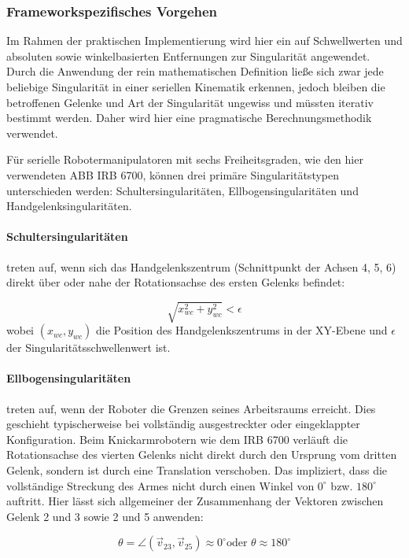 \subsubsection{Frameworkspezifisches Vorgehen}
Im Rahmen der praktischen Implementierung wird hier ein auf Schwellwerten und
absoluten sowie winkelbasierten Entfernungen zur Singularität angewendet. Durch
die Anwendung der rein mathematischen Definition ließe sich zwar jede beliebige
Singularität in einer seriellen Kinematik erkennen, jedoch bleiben die
betroffenen Gelenke und Art der Singularität ungewiss und müssten iterativ
bestimmt werden. Daher wird hier eine pragmatische Berechnungsmethodik
verwendet.

Für serielle Robotermanipulatoren mit sechs Freiheitsgraden, wie den hier
verwendeten ABB IRB 6700, können drei primäre Singularitätstypen unterschieden
werden: Schultersingularitäten, Ellbogensingularitäten und
Handgelenksingularitäten.

\paragraph{Schultersingularitäten} treten auf, wenn sich das
Handgelenkszentrum (Schnittpunkt der Achsen 4, 5, 6) direkt über oder nahe der
Rotationsachse des ersten Gelenks befindet:

\begin{equation}
  \sqrt{x_{wc}^2 + y_{wc}^2} < \epsilon
  \label{eq:shoulder_singularity}
\end{equation}
\noindent
wobei $(x_{wc}, y_{wc})$ die Position des Handgelenkszentrums in der XY-Ebene
und $\epsilon$ der Singularitätsschwellenwert ist.

\paragraph{Ellbogensingularitäten} treten auf, wenn der Roboter die
Grenzen seines
Arbeitsraums erreicht. Dies geschieht typischerweise bei vollständig
ausgestreckter oder eingeklappter Konfiguration. Beim
Knickarmrobotern wie dem IRB 6700
verläuft die Rotationsachse des vierten Gelenks nicht direkt durch
den Ursprung vom
dritten Gelenk, sondern ist durch eine Translation verschoben. Das impliziert,
dass die vollständige Streckung des Armes nicht durch einen Winkel
von $0^\circ$ bzw.
$180^\circ$ auftritt. Hier lässt sich allgemeiner der Zusammenhang der Vektoren
zwischen Gelenk 2 und 3 sowie 2 und 5 anwenden:

\begin{equation}
  \theta = \angle(\vec{v}_{23}, \vec{v}_{25}) \approx 0^\circ \text{
  oder } \theta \approx 180^\circ
  \label{eq:elbow_singularity}
\end{equation}

